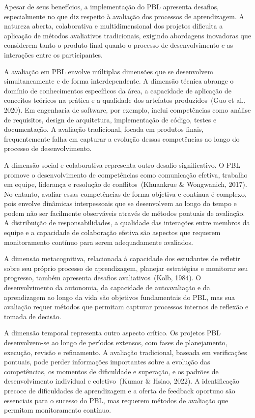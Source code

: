 \documentclass[english, spanish, brazilian]{modelo_dt}
\begin{document}
Apesar de seus benefícios, a implementação do PBL apresenta desafios, especialmente no que diz respeito à avaliação dos processos de aprendizagem. A natureza aberta, colaborativa e multidimensional dos projetos dificulta a aplicação de métodos avaliativos tradicionais, exigindo abordagens inovadoras que considerem tanto o produto final quanto o processo de desenvolvimento e as interações entre os participantes.

A avaliação em PBL envolve múltiplas dimensões que se desenvolvem simultaneamente e de forma interdependente. A dimensão técnica abrange o domínio de conhecimentos específicos da área, a capacidade de aplicação de conceitos teóricos na prática e a qualidade dos artefatos produzidos~(Guo et al., 2020). Em engenharia de software, por exemplo, inclui competências como análise de requisitos, design de arquitetura, implementação de código, testes e documentação. A avaliação tradicional, focada em produtos finais, frequentemente falha em capturar a evolução dessas competências ao longo do processo de desenvolvimento.

A dimensão social e colaborativa representa outro desafio significativo. O PBL promove o desenvolvimento de competências como comunicação efetiva, trabalho em equipe, liderança e resolução de conflitos~(Khuankrue & Wongwanich, 2017). No entanto, avaliar essas competências de forma objetiva e contínua é complexo, pois envolve dinâmicas interpessoais que se desenvolvem ao longo do tempo e podem não ser facilmente observáveis através de métodos pontuais de avaliação. A distribuição de responsabilidades, a qualidade das interações entre membros da equipe e a capacidade de colaboração efetiva são aspectos que requerem monitoramento contínuo para serem adequadamente avaliados.

A dimensão metacognitiva, relacionada à capacidade dos estudantes de refletir sobre seu próprio processo de aprendizagem, planejar estratégias e monitorar seu progresso, também apresenta desafios avaliativos~(Kolb, 1984). O desenvolvimento da autonomia, da capacidade de autoavaliação e da aprendizagem ao longo da vida são objetivos fundamentais do PBL, mas sua avaliação requer métodos que permitam capturar processos internos de reflexão e tomada de decisão.

A dimensão temporal representa outro aspecto crítico. Os projetos PBL desenvolvem-se ao longo de períodos extensos, com fases de planejamento, execução, revisão e refinamento. A avaliação tradicional, baseada em verificações pontuais, pode perder informações importantes sobre a evolução das competências, os momentos de dificuldade e superação, e os padrões de desenvolvimento individual e coletivo~(Kumar & Hsiao, 2022). A identificação precoce de dificuldades de aprendizagem e a oferta de feedback oportuno são essenciais para o sucesso do PBL, mas requerem métodos de avaliação que permitam monitoramento contínuo.
\end{document}
